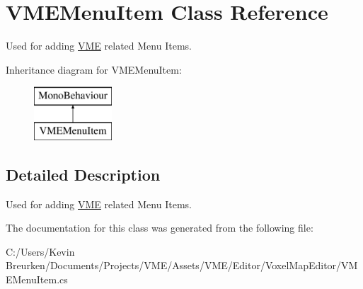 \hypertarget{class_v_m_e_menu_item}{}\section{V\+M\+E\+Menu\+Item Class Reference}
\label{class_v_m_e_menu_item}


Used for adding \hyperlink{namespace_v_m_e}{V\+ME} related Menu Items.  


Inheritance diagram for V\+M\+E\+Menu\+Item\+:\begin{figure}[H]
\begin{center}
\leavevmode
\includegraphics[height=2.000000cm]{class_v_m_e_menu_item}
\end{center}
\end{figure}


\subsection{Detailed Description}
Used for adding \hyperlink{namespace_v_m_e}{V\+ME} related Menu Items. 



The documentation for this class was generated from the following file\+:\begin{DoxyCompactItemize}
\item 
C\+:/\+Users/\+Kevin Breurken/\+Documents/\+Projects/\+V\+M\+E/\+Assets/\+V\+M\+E/\+Editor/\+Voxel\+Map\+Editor/V\+M\+E\+Menu\+Item.\+cs\end{DoxyCompactItemize}
